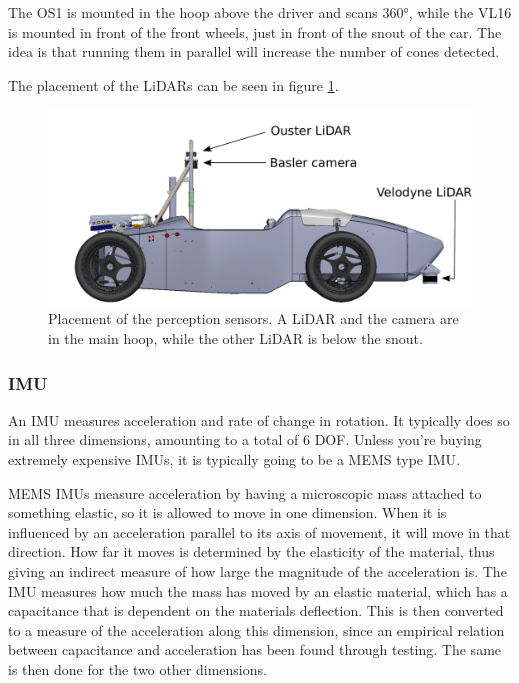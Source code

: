The OS1 is mounted in the hoop above the driver and scans $360$\si{\degree}, while the VL16 is mounted in front of the front wheels, just in front of the snout of the car. The idea is that running them in parallel will increase the number of cones detected. 

The placement of the \glspl{LiDAR} can be seen in figure \ref{Fig:SensorPlacementsV2}.


\begin{figure}
    \centering
    \includegraphics[width=0.8\linewidth]{0_Images/3_Background/SensorPlacements.pdf}
    \caption[Placement of the perception sensors.]{Placement of the perception sensors. A LiDAR and the camera are in the main hoop, while the other LiDAR is below the snout.}
    \label{Fig:SensorPlacementsV2}
\end{figure}

\subsubsection{IMU}
An \gls{IMU} measures acceleration and rate of change in rotation. It typically does so in all three dimensions, amounting to a total of 6 \gls{DOF}. Unless you're buying extremely expensive \glspl{IMU}, it is typically going to be a \gls{MEMS} type \gls{IMU}. 

\gls{MEMS} \glspl{IMU} measure acceleration by having a microscopic mass attached to something elastic, so it is allowed to move in one dimension. When it is influenced by an acceleration parallel to its axis of movement, it will move in that direction. How far it moves is determined by the elasticity of the material, thus giving an indirect measure of how large the magnitude of the acceleration is. The \gls{IMU} measures how much the mass has moved by an elastic material, which has a capacitance that is dependent on the materials deflection. This is then converted to a measure of the acceleration along this dimension, since an empirical relation between capacitance and acceleration has been found through testing. The same is then done for the two other dimensions. 

